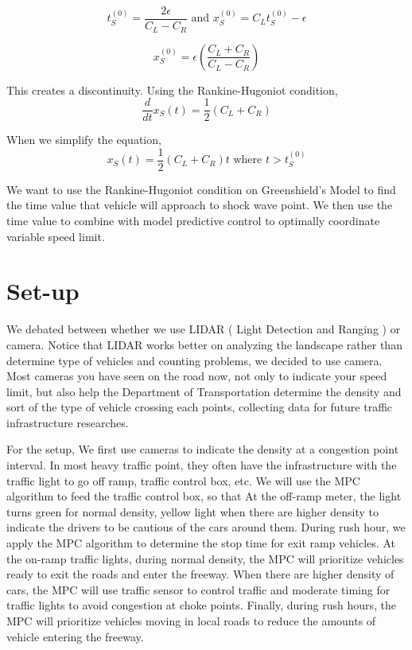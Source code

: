 \documentclass{article}
\begin{document}
$$t_S^{(0)} = \frac{2\epsilon}{C_L-C_R} \text{ and } x_S^{(0)} = C_L t_S^{(0)} - \epsilon$$

$$x_S^{(0)} = \epsilon\left(\frac{C_L+C_R}{C_L-C_R}\right)$$

This creates a discontinuity. Using the Rankine-Hugoniot condition, 
$$\frac{d}{dt}x_S(t) = \frac{1}{2}(C_L+C_R)$$

When we simplify the equation, $$x_S(t) = \frac{1}{2}(C_L+C_R)t \text{ where } t > t_S^{(0)}$$


We want to use the Rankine-Hugoniot condition on Greenshield's Model to find the time value that vehicle will approach to shock wave point. We then use the time value to combine with model predictive control to optimally coordinate variable speed limit.


\section*{Set-up}

We debated between whether we use LIDAR ( Light Detection and Ranging ) or camera. Notice that LIDAR works better on analyzing the landscape rather than determine type of vehicles and counting problems, we decided to use camera. Most cameras you have seen on the road now, not only to indicate your speed limit, but also help the Department of Transportation determine the density and sort of the type of vehicle crossing each points, collecting data for future traffic infrastructure researches. 


For the setup, We first use cameras to indicate the density at a congestion point interval. In most heavy traffic point, they often have the infrastructure with the traffic light to go off ramp, traffic control box, etc. We will use the MPC algorithm to feed the traffic control box, so that
At the off-ramp meter, the light turns green for normal density, yellow light when there are higher density to indicate the drivers to be cautious of the cars around them. During rush hour, we apply the MPC algorithm to determine the stop time for exit ramp vehicles.
At the on-ramp traffic lights, during normal density, the MPC will prioritize vehicles ready to exit the roads and enter the freeway. When there are higher density of cars, the MPC will use traffic sensor to control traffic and moderate timing for traffic lights to avoid congestion at choke points. Finally, during rush hours, the MPC will prioritize vehicles moving in local roads to reduce the amounts of vehicle entering the freeway.
\end{document}
